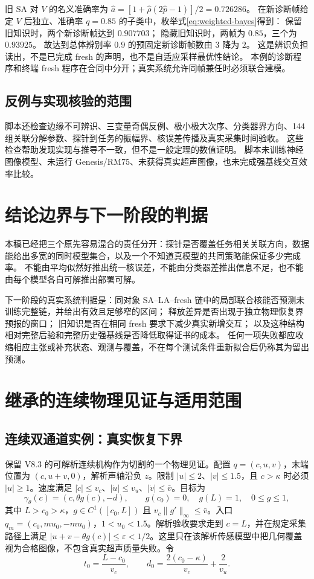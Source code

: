 \documentclass[11pt,a4paper,fontset=fandol]{ctexart}
\theoremstyle{definition}
\theoremstyle{remark}
\numberwithin{equation}{section}
\begin{document}
旧 SA 对 $V$ 的名义准确率为
$\widehat a=[1+\widehat\rho(2\widehat p-1)]/2=0.726286$。
在新诊断帧给定 $V$ 后独立、准确率 $q=0.85$ 的子类中，枚举式\eqref{eq:weighted-bayes}得到：
保留旧知识时，两个新诊断帧达到 $0.907703$；
隐藏旧知识时，两帧为 $0.85$，三个为 $0.93925$。
故达到总体辨别率 $0.9$ 的预固定新诊断帧数由 $3$ 降为 $2$。
这是辨识负担读出，不是已完成 fresh 的声明，也不是自适应采样最优性结论。
本例的诊断程序和终端 fresh 程序在合同中分开；真实系统允许同帧兼任时必须联合建模。

\subsection{反例与实现核验的范围}
脚本还检查边缘不可辨识、三变量奇偶反例、极小极大次序、分类器界方向、144 组关联分解参数、探针到任务的振幅界、核误差传播及真实采集时间验收。
这些检查帮助发现实现与推导不一致，但不是一般定理的数值证明。
脚本未训练神经图像模型、未运行 Genesis/RM75、未获得真实超声图像，也未完成强基线交互效率比较。

\section{结论边界与下一阶段的判据}
\label{sec:discussion}
本稿已经把三个原先容易混合的责任分开：探针是否覆盖任务相关关联方向，数据能给出多宽的同时模型集合，以及一个不知道真模型的共同策略能保证多少完成率。
不能由平均似然好推出统一核误差，不能由分类器差推出信息不足，也不能由每个模型各自可解推出部署可解。

下一阶段的真实系统判据是：同对象 SA--LA--fresh 链中的局部联合核能否预测未训练完整链，并给出有效且足够窄的区间；
释放差异是否出现于独立物理恢复界预报的窗口；
旧知识是否在相同 fresh 要求下减少真实新增交互；
以及这种结构相对完整后验和完整历史强基线是否降低取得证书的成本。
任何一项失败都应收缩相应主张或补充状态、观测与覆盖，不在每个测试条件重新拟合后仍称其为留出预测。

\appendix
\section{继承的连续物理见证与适用范围}
\subsection{连续双通道实例：真实恢复下界}
\label{sec:continuous}
保留 V8.3 的可解析连续机构作为切割的一个物理见证\cite{v83}。配置 $q=(c,u,v)$，末端位置为 $(c,u+v,0)$，解析声轴沿负 $z$。限制 $|u|\le2$、$|v|\le1.5$，且 $c>\kappa$ 时必须 $|u|\ge1$。速度满足 $|\dot c|\le v_c$、$|\dot u|\le v_u$、$|\dot v|\le\bar v$。目标为
\[
 \gamma_\theta(c)=(c,\theta g(c),-d),\qquad
 g(c_0)=0,\quad g(L)=1,\quad 0\le g\le1,
\]
其中 $L>c_0>\kappa$，$g\in C^1([c_0,L])$ 且 $v_c\|g'\|_\infty\le\bar v$。入口 $q_m=(c_0,mu_0,-mu_0)$，$1<u_0<1.5$。解析验收要求走到 $c=L$，并在规定采集路径上满足 $|u+v-\theta g(c)|\le\varepsilon<1/2$。这里只在该解析传感模型中把几何覆盖视为合格图像，不包含真实超声质量失败。令
\begin{equation}
 t_0=\frac{L-c_0}{v_c},\qquad
 d_0=\frac{2(c_0-\kappa)}{v_c}+\frac2{v_u}.
 \label{eq:continuous-times}
\end{equation}
\end{document}
